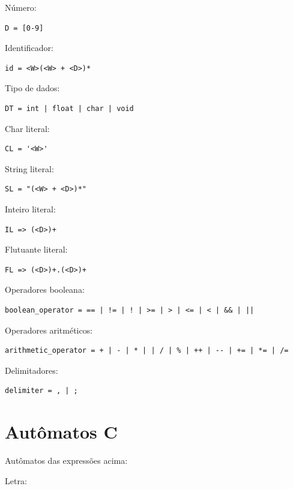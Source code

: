 \documentclass[]{article}
\numberwithin{equation}{section}
\begin{document}
Número:
\begin{lstlisting}
D = [0-9]
\end{lstlisting}

Identificador:
\begin{lstlisting}
id = <W>(<W> + <D>)*
\end{lstlisting}

Tipo de dados:
\begin{lstlisting}
DT = int | float | char | void
\end{lstlisting}

Char literal:
\begin{lstlisting}
CL = '<W>'
\end{lstlisting}

String literal:
\begin{lstlisting}
SL = "(<W> + <D>)*"
\end{lstlisting}

Inteiro literal:
\begin{lstlisting}
IL => (<D>)+
\end{lstlisting}

Flutuante literal:
\begin{lstlisting}
FL => (<D>)+.(<D>)+
\end{lstlisting}

Operadores booleana:
\begin{lstlisting}
boolean_operator = == | != | ! | >= | > | <= | < | && | ||
\end{lstlisting}

Operadores aritméticos:
\begin{lstlisting}
arithmetic_operator = + | - | * | | / | % | ++ | -- | += | *= | /=
\end{lstlisting}

Delimitadores:
\begin{lstlisting}
delimiter = , | ; 
\end{lstlisting}

\section{Autômatos C}
Autômatos das expressões acima:

Letra:
\begin{center}
\end{center}
\end{document}
